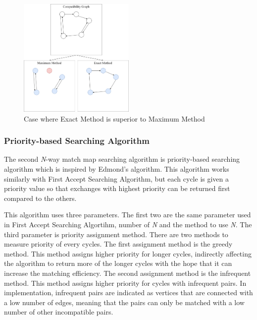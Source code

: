 \documentclass[conference]{IEEEtran}
\begin{document}
\begin{figure}[h]
    \includegraphics[width=0.5\textwidth]{images/maximum-vs-exact.png}
    \caption{Case where Exact Method is superior to Maximum Method}
    \label{maxvsexact}
\end{figure}

\subsubsection{Priority-based Searching Algorithm}
The second \textit{N}-way match map searching algorithm is priority-based searching algorithm which is inspired by Edmond's
algorithm. This algorithm works similarly with First Accept Searching Algorithm, but each cycle is given a priority value so
that exchanges with highest priority can be returned first compared to the others.

This algorithm uses three parameters. The first two are the same parameter used in First Accept Searching Algortihm, number of \textit{N}
and the method to use \textit{N}. The third parameter is priority assignment method. There are two methods to measure priority of every cycles.
The first assignment method is the greedy method. This method assigns higher priority for longer cycles, indirectly affecting the algorithm
to return more of the longer cycles with the hope that it can increase the matching efficiency.
The second assignment method is the infrequent method. This method assigns higher priority for cycles with infrequent pairs. In implementation,
infrequent pairs are indicated as vertices that are connected with a low number of edges, meaning that the pairs can only be matched with a low
number of other incompatible pairs.
\end{document}

